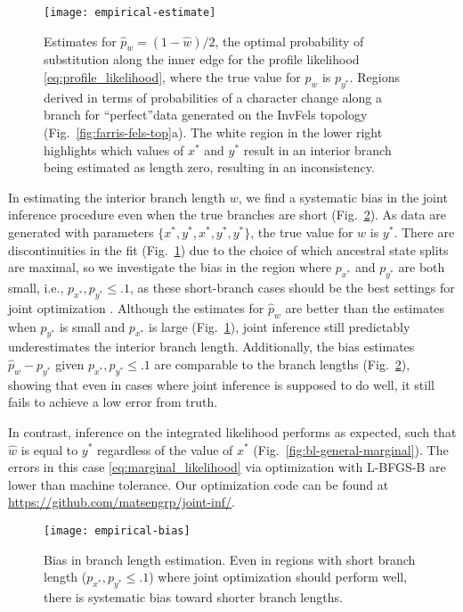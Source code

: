 \documentclass[11pt]{article}
\begin{document}
\begin{figure}
\centering
\texttt{[image: empirical-estimate]}
\caption{
    Estimates for $\hat{p}_w=(1-\hat{w})/2$, the optimal probability of substitution along the inner edge for the profile likelihood \eqref{eq:profile_likelihood}, where the true value for $p_w$ is $p_{y^*}$.
    Regions derived in terms of probabilities of a character change along a branch for ``perfect''data generated on the InvFels topology (Fig.~\ref{fig:farris-fels-top}a).
    The white region in the lower right highlights which values of $x^*$ and $y^*$ result in an interior branch being estimated as length zero, resulting in an inconsistency.
}
\label{fig:bl-general-inconsistency}
\end{figure}


In estimating the interior branch length $w$, we find a systematic bias in the joint inference procedure even when the true branches are short (Fig.~\ref{fig:empirical-bias}).
As data are generated with parameters $\{x^*, y^*, x^*, y^*, y^*\}$, the true value for $w$ is $y^*$.
There are discontinuities in the fit (Fig.~\ref{fig:bl-general-inconsistency}) due to the choice of which ancestral state splits are maximal, so we investigate the bias in the region where $p_{x^*}$ and $p_{y^*}$ are both small, i.e., $p_{x^*}, p_{y^*} \le .1$, as these short-branch cases should be the best settings for joint optimization \citep{Sagulenko2018-xl}.
Although the estimates for $\hat{p}_w$ are better than the estimates when $p_{y^*}$ is small and $p_{x^*}$ is large (Fig.~\ref{fig:bl-general-inconsistency}), joint inference still predictably underestimates the interior branch length.
Additionally, the bias estimates $\hat{p}_w-p_{y^*}$ given $p_{x^*}, p_{y^*} \le .1$ are comparable to the branch lengths (Fig.~\ref{fig:empirical-bias}), showing that even in cases where joint inference is supposed to do well, it still fails to achieve a low error from truth.

In contrast, inference on the integrated likelihood performs as expected, such that $\hat{w}$ is equal to $y^*$ regardless of the value of $x^*$ (Fig.~\ref{fig:bl-general-marginal}).
The errors in this case \eqref{eq:marginal_likelihood} via optimization with L-BFGS-B are lower than machine tolerance.
Our optimization code can be found at \url{https://github.com/matsengrp/joint-inf/}.


\begin{figure}
\centering
\texttt{[image: empirical-bias]}
\caption{
Bias in branch length estimation.
Even in regions with short branch length ($p_{x^*}, p_{y^*} \le .1$) where joint optimization should perform well, there is systematic bias toward shorter branch lengths.
}
\label{fig:empirical-bias}
\end{figure}
\end{document}
